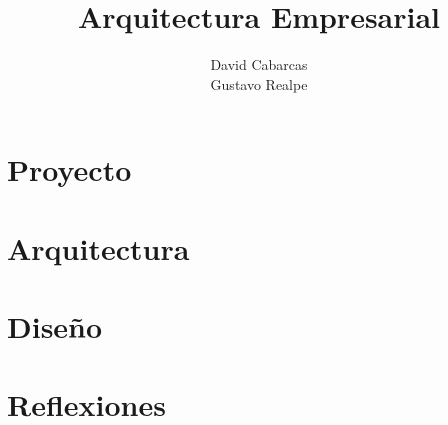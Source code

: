 \documentclass[12pt]{book}
\title{Arquitectura Empresarial}
\author{David Cabarcas \\ Gustavo Realpe}
\begin{document}
\maketitle
\tableofcontents
\listoffigures
\part{Proyecto}


\part{Arquitectura}






\part{Diseño}



\part{Reflexiones}

\end{document}
